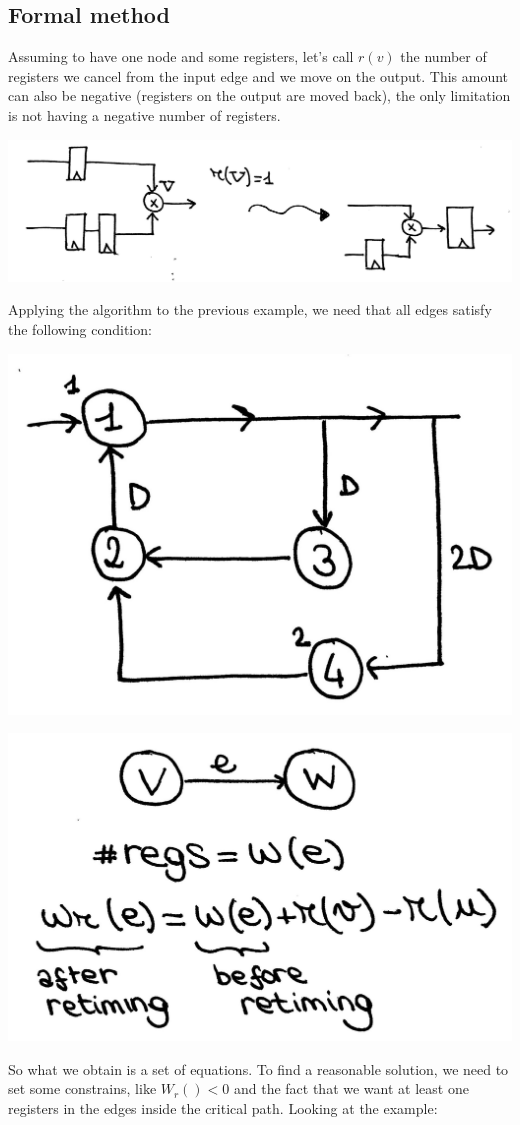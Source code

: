 \subsection{Formal method}
Assuming to have one node and some registers, let's call $r(v)$ the number of registers we cancel from the input edge and we move on the output. This amount can also be negative (registers on the output are moved back), the only limitation is not having a negative number of registers.
\begin{center}
  \includegraphics[width=0.7\linewidth]{img/img1/13}
\end{center}

Applying the algorithm to the previous example, we need that all edges satisfy the following condition:
\begin{center}
  \includegraphics[width=0.5\linewidth]{img/img1/14}
\end{center}
\begin{center}
  \includegraphics[width=0.5\linewidth]{img/img1/15}
\end{center}

So what we obtain is a set of equations. To find a reasonable solution, we need to set some constrains, like $W_r()<0$ and the fact that we want at least one registers in the edges inside the critical path. Looking at the example:

